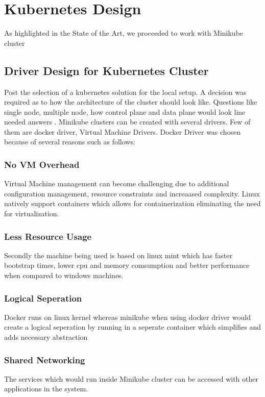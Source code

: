 {\section{Kubernetes Design}
As highlighted in the State of the Art, we proceeded to work with Minikube cluster

\subsection{Driver Design for Kubernetes Cluster}
Post the selection of a kubernetes solution for the local setup. A decision was required as to how the architecture of the cluster should look like. Questions like single node, multiple node, how control plane and data plane would look line needed answers . Minikube clusters can be created with several drivers. Few of them are docker driver, Virtual Machine Drivers. Docker Driver was chosen because of several reasons such as follows:

\subsubsection{No VM Overhead}
Virtual Machine management can become challenging due to additional configuration management, resource constraints and increaased complexity. Linux natively support containers which allows for containerization eliminating the need for virtualization. 

\subsubsection{Less Resource Usage}
Secondly the machine being used is based on linux mint which has faster bootstrap times, lower cpu and memory comsumption and better performance when compared to windows machines.

\subsubsection{Logical Seperation}
Docker runs on linux kernel whereas minikube when using docker driver would create a logical seperation by running in a seperate container which simplifies and adds necessary abstraction

\subsubsection{Shared Networking}
The services which would run inside Minikube cluster can be accessed with other applications in the system.

}
